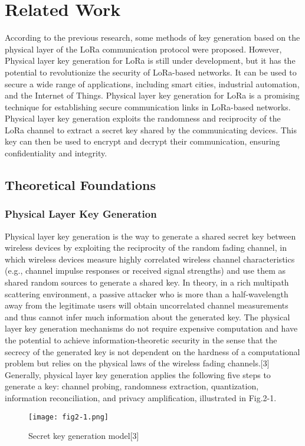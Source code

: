 
\chapter{Related Work}
According to the previous research, some methods of key generation based on the physical layer of the LoRa communication protocol were proposed. However, Physical layer key generation for LoRa is still under development, but it has the potential to revolutionize the security of LoRa-based networks. It can be used to secure a wide range of applications, including smart cities, industrial automation, and the Internet of Things.
Physical layer key generation for LoRa is a promising technique for establishing secure communication links in LoRa-based networks. Physical layer key generation exploits the randomness and reciprocity of the LoRa channel to extract a secret key shared by the communicating devices. This key can then be used to encrypt and decrypt their communication, ensuring confidentiality and integrity.

\section{Theoretical Foundations}

\subsection{Physical Layer Key Generation}
Physical layer key generation is the way to generate a shared secret key between wireless devices by exploiting the reciprocity of the random fading channel, in which wireless devices measure highly correlated wireless channel characteristics (e.g., channel impulse responses or received signal strengths) and use them as shared random sources to generate a shared key. In theory, in a rich multipath scattering environment, a passive attacker who is more than a half-wavelength away from the legitimate users will obtain uncorrelated channel measurements and thus cannot infer much information about the generated key. The physical layer key generation mechanisms do not require expensive computation and have the potential to achieve information-theoretic security in the sense that the secrecy of the generated key is not dependent on the hardness of a computational problem but relies on the physical laws of the wireless fading channels.[3] 
Generally, physical layer key generation applies the following five steps to generate a key: channel probing, randomness extraction, quantization, information reconciliation, and privacy amplification, illustrated in Fig.2-1.
\begin{figure}
  \centering
  \texttt{[image: fig2-1.png]}
  \caption{Secret key generation model[3]}
  \label{fig:2-1}
\end{figure}

